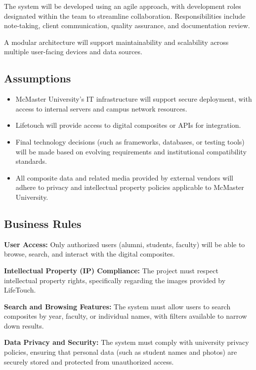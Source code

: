 \documentclass[12pt]{article}
\begin{document}
The system will be developed using an agile approach, with development roles designated within the team to streamline collaboration. Responsibilities include note-taking, client communication, quality assurance, and documentation review.

A modular architecture will support maintainability and scalability across multiple user-facing devices and data sources.

\subsection*{Assumptions}

\begin{itemize}
  \item McMaster University's IT infrastructure will support secure deployment, with access to internal servers and campus network resources.
  \item Lifetouch will provide access to digital composites or APIs for integration.
  \item Final technology decisions (such as frameworks, databases, or testing tools) will be made based on evolving requirements and institutional compatibility standards.
  \item All composite data and related media provided by external vendors will adhere to privacy and intellectual property policies applicable to McMaster University.
\end{itemize}

\subsection{Business Rules}

\textbf{User Access:} Only authorized users (alumni, students, faculty) will be able to browse, search, and interact with the digital composites.

\textbf{Intellectual Property (IP) Compliance:} The project must respect intellectual property rights, specifically regarding the images provided by LifeTouch.

\textbf{Search and Browsing Features:} The system must allow users to search composites by year, faculty, or individual names, with filters available to narrow down results.

\textbf{Data Privacy and Security:} The system must comply with university privacy policies, ensuring that personal data (such as student names and photos) are securely stored and protected from unauthorized access.
\end{document}
